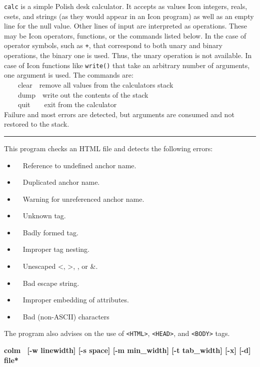 {\texttt{calc} is a simple Polish {\textquotedbl}desk
calculator{\textquotedbl}. It accepts as values Icon integers, reals,
csets, and strings (as they would appear in an Icon program) as well as
an empty line for the null value. Other lines of input are interpreted
as operations. These may be Icon operators, functions, or the commands
listed below. In the case of operator symbols, such as \texttt{+}, that
correspond to both unary and binary operations, the binary one is used.
Thus, the unary operation is not available. In case of Icon functions
like \texttt{write()} that take an arbitrary number of arguments, one
argument is used. The commands are:\\
 \ \ \ \ clear\ \ remove all values from the
calculator{\textquotesingle}s stack\\
 \ \ \ \ dump\ \ write out the contents of the stack\\
 \ \ \ \ quit\ \ \ \ exit from the calculator\\
Failure and most errors are detected, but arguments are consumed and not
restored to the stack.

\vspace{0.25cm}\hrule{}

This program checks an HTML file and detects the following
errors:

\begin{itemize}
\item \ \ Reference to undefined anchor name.
\item \ \ Duplicated anchor name.
\item \ \ Warning for unreferenced anchor name.
\item \ \ Unknown tag.
\item \ \ Badly formed tag.
\item \ \ Improper tag nesting.
\item \ \ Unescaped {\textless}, {\textgreater}, {\textquotedbl}, or \&.
\item \ \ Bad escape string.
\item \ \ Improper embedding of attributes.
\item \ \ Bad (non-ASCII) characters
\end{itemize}
The program also advises on the use of
\texttt{{\textless}HTML{\textgreater}},
\texttt{{\textless}HEAD{\textgreater}}, and
\texttt{{\textless}BODY{\textgreater}} tags. 

{\sffamily\bfseries
colm \ \textrm{\textmd{[-w linewidth] [-s space] [-m min\_width] [-t
tab\_width] [-x] [-d] file*}}}

}
